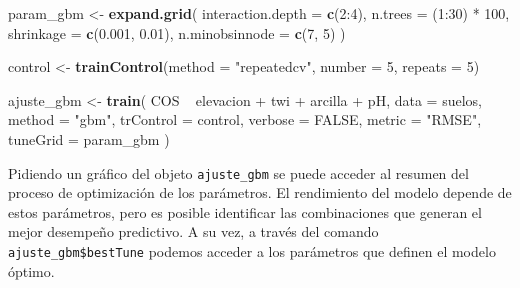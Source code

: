 \documentclass[11pt,b5paper,]{krantz}
\newenvironment{Shaded}{}{}
\newcommand{\KeywordTok}[1]{\textcolor[rgb]{0.00,0.44,0.13}{\textbf{#1}}}
\newcommand{\DataTypeTok}[1]{\textcolor[rgb]{0.56,0.13,0.00}{#1}}
\newcommand{\DecValTok}[1]{\textcolor[rgb]{0.25,0.63,0.44}{#1}}
\newcommand{\FloatTok}[1]{\textcolor[rgb]{0.25,0.63,0.44}{#1}}
\newcommand{\StringTok}[1]{\textcolor[rgb]{0.25,0.44,0.63}{#1}}
\newcommand{\CommentTok}[1]{\textcolor[rgb]{0.38,0.63,0.69}{\textit{#1}}}
\newcommand{\OtherTok}[1]{\textcolor[rgb]{0.00,0.44,0.13}{#1}}
\newcommand{\OperatorTok}[1]{\textcolor[rgb]{0.40,0.40,0.40}{#1}}
\newcommand{\NormalTok}[1]{#1}
\begin{document}
\begin{Shaded}
\begin{Highlighting}[]
\NormalTok{param_gbm <-}\StringTok{  }\KeywordTok{expand.grid}\NormalTok{(}
  \DataTypeTok{interaction.depth =} \KeywordTok{c}\NormalTok{(}\DecValTok{2}\OperatorTok{:}\DecValTok{4}\NormalTok{),}
  \DataTypeTok{n.trees =}\NormalTok{ (}\DecValTok{1}\OperatorTok{:}\DecValTok{30}\NormalTok{) }\OperatorTok{*}\StringTok{ }\DecValTok{100}\NormalTok{,}
  \DataTypeTok{shrinkage =} \KeywordTok{c}\NormalTok{(}\FloatTok{0.001}\NormalTok{, }\FloatTok{0.01}\NormalTok{),}
  \DataTypeTok{n.minobsinnode =} \KeywordTok{c}\NormalTok{(}\DecValTok{7}\NormalTok{, }\DecValTok{5}\NormalTok{)}
\NormalTok{)}

\NormalTok{control <-}\StringTok{ }\KeywordTok{trainControl}\NormalTok{(}\DataTypeTok{method =} \StringTok{"repeatedcv"}\NormalTok{,}
                        \DataTypeTok{number =} \DecValTok{5}\NormalTok{,}
                        \DataTypeTok{repeats =} \DecValTok{5}\NormalTok{)}

\NormalTok{ajuste_gbm <-}\StringTok{ }\KeywordTok{train}\NormalTok{(}
\NormalTok{  COS }\OperatorTok{~}\StringTok{ }\NormalTok{elevacion }\OperatorTok{+}\StringTok{ }\NormalTok{twi }\OperatorTok{+}\StringTok{ }\NormalTok{arcilla }\OperatorTok{+}\StringTok{ }\NormalTok{pH,}
  \DataTypeTok{data =}\NormalTok{ suelos,}
  \DataTypeTok{method =} \StringTok{"gbm"}\NormalTok{,}
  \DataTypeTok{trControl =}\NormalTok{ control,}
  \DataTypeTok{verbose =} \OtherTok{FALSE}\NormalTok{,}
  \DataTypeTok{metric =} \StringTok{"RMSE"}\NormalTok{,}
  \DataTypeTok{tuneGrid =}\NormalTok{ param_gbm}
\NormalTok{)}
\end{Highlighting}
\end{Shaded}

Pidiendo un gráfico del objeto \texttt{ajuste\_gbm} se puede acceder al
resumen del proceso de optimización de los parámetros. El rendimiento
del modelo depende de estos parámetros, pero es posible identificar las
combinaciones que generan el mejor desempeño predictivo. A su vez, a
través del comando \texttt{ajuste\_gbm\$bestTune} podemos acceder a los
parámetros que definen el modelo óptimo.

\begin{Shaded}
\end{Shaded}
\end{document}
